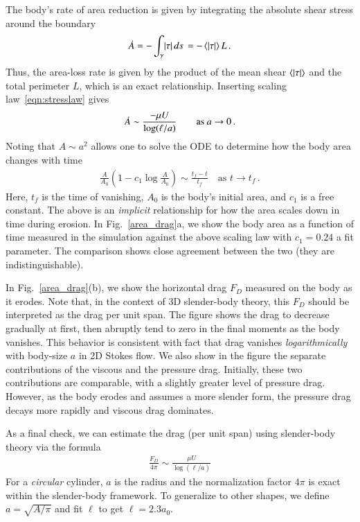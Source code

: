\documentclass[preprint, 10pt]{elsarticle}
\begin{document}
The body's rate of area reduction is given by integrating the absolute shear stress around the boundary
\begin{align}
\dot{A} = - \int_{\gamma} \lvert \tau \rvert \, ds \,  = - \left< \lvert \tau \rvert \right> L \, .
\end{align}
Thus, the area-loss rate is given by the product of the mean shear
$\left< \lvert \tau \rvert \right>$ and the total perimeter $L$, which is an exact relationship. Inserting scaling law~\eqref{eqn:stresslaw} gives
\begin{align}
\dot{A} \sim \frac{ - \mu U}{\log(\ell/a)} \qquad \text{as } a \to 0 \, . 
\end{align}
Noting that $A \sim a^2$ allows one to solve the ODE to determine how the body area changes with time
\begin{align}
\label{area_predict}
\frac{A}{A_0} \left( 1 - c_1 \log{\frac{A}{A_0}} \right) \sim \frac{t_f - t}{t_f} \quad \text{as } t \to t_f \, .
\end{align}
Here, $t_f$ is the time of vanishing, $A_0$ is the body's initial area, and $c_1$ is a free constant. The above is an {\em implicit} relationship for how the area scales down in time during erosion. In Fig.~\ref{area_drag}a, we show the body area as a function of time measured in the simulation against the above scaling law with $c_1 = 0.24$ a fit parameter. The comparison shows close agreement between the two (they are indistinguishable).

In Fig.~\ref{area_drag}(b), we show the horizontal drag $F_D$ measured on the body as it erodes. Note that, in the context of 3D slender-body theory, this $F_D$ should be interpreted as the drag per unit span. The figure shows the drag to decrease  gradually at first, then abruptly tend to zero in the final moments as the body vanishes. This behavior is consistent with fact that drag vanishes {\em logarithmically} with body-size $a$  in 2D Stokes flow. We also show in the figure the separate contributions of the viscous and the pressure drag. Initially, these two contributions are comparable, with a slightly greater level of pressure drag. However, as the body erodes and assumes a more slender form, the pressure drag decays more rapidly and viscous drag dominates.

As a final check, we can estimate the drag (per unit span) using slender-body theory via the formula
\begin{align}
\label{dragscaling}
\frac{F_D}{4 \pi} \sim \frac{ \mu U}{\log(\ell/a)}
\end{align}
For a {\em circular} cylinder, $a$ is the radius and the normalization factor $4 \pi$ is exact within the slender-body framework. To generalize to other shapes, we define $a = \sqrt{A/\pi}$ and fit $\ell$ to get $\ell = 2.3 a_0$.
\end{document}
